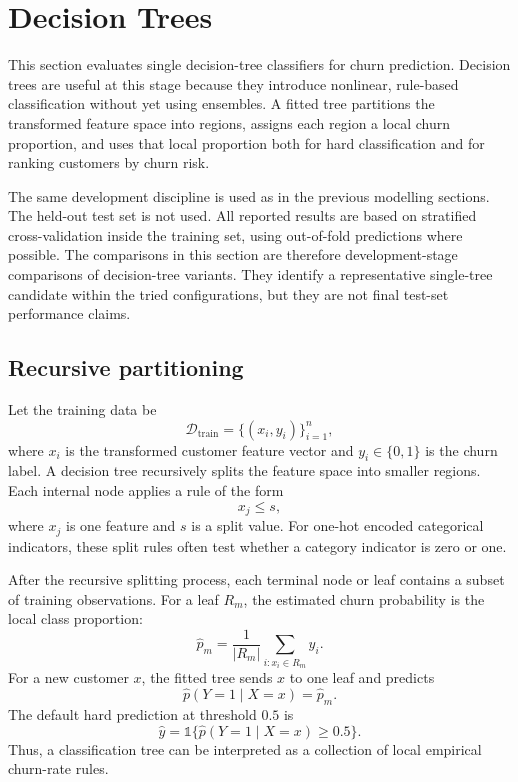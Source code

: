 \newpage
\section{Decision Trees}
\label{sec:decision-trees}

This section evaluates single decision-tree classifiers for churn prediction. Decision trees are useful at this stage because they introduce nonlinear, rule-based classification without yet using ensembles. A fitted tree partitions the transformed feature space into regions, assigns each region a local churn proportion, and uses that local proportion both for hard classification and for ranking customers by churn risk.

The same development discipline is used as in the previous modelling sections. The held-out test set is not used. All reported results are based on stratified cross-validation inside the training set, using out-of-fold predictions where possible. The comparisons in this section are therefore development-stage comparisons of decision-tree variants. They identify a representative single-tree candidate within the tried configurations, but they are not final test-set performance claims.

\subsection{Recursive partitioning}

Let the training data be
\[
\mathcal{D}_{\mathrm{train}}
=
\{(x_i,y_i)\}_{i=1}^{n},
\]
where \(x_i\) is the transformed customer feature vector and \(y_i\in\{0,1\}\) is the churn label. A decision tree recursively splits the feature space into smaller regions. Each internal node applies a rule of the form
\[
x_j \leq s,
\]
where \(x_j\) is one feature and \(s\) is a split value. For one-hot encoded categorical indicators, these split rules often test whether a category indicator is zero or one.

After the recursive splitting process, each terminal node or leaf contains a subset of training observations. For a leaf \(R_m\), the estimated churn probability is the local class proportion:
\[
\widehat{p}_m
=
\frac{1}{|R_m|}
\sum_{i:x_i\in R_m} y_i.
\]
For a new customer \(x\), the fitted tree sends \(x\) to one leaf and predicts
\[
\widehat{p}(Y=1\mid X=x)=\widehat{p}_m.
\]
The default hard prediction at threshold \(0.5\) is
\[
\widehat{y}
=
\mathbb{1}\{\widehat{p}(Y=1\mid X=x)\geq 0.5\}.
\]
Thus, a classification tree can be interpreted as a collection of local empirical churn-rate rules.

